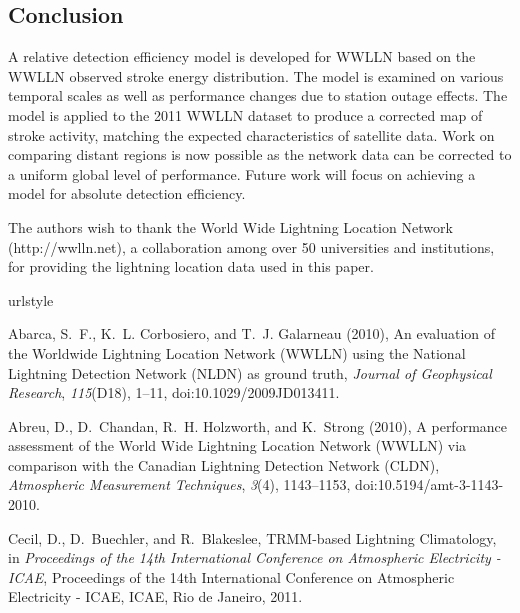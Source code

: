 \documentclass[draft,ras]{agutex}
\begin{document}
\begin{article}
\section{Conclusion}

A relative detection efficiency model is developed for WWLLN based on the WWLLN observed stroke energy distribution. The model is examined on various temporal scales as well as performance changes due to station outage effects. The model is applied to the 2011 WWLLN dataset to produce a corrected map of stroke activity, matching the expected characteristics of satellite data. Work on comparing distant regions is now possible as the network data can be corrected to a uniform global level of performance. Future work will focus on achieving a model for absolute detection efficiency.

\begin{acknowledgments}

The authors wish to thank the World Wide Lightning Location Network (http://wwlln.net), a collaboration among over 50 universities and institutions, for providing the lightning location data used in this paper.

\end{acknowledgments}

  \begin{thebibliography}{23}
\providecommand{\natexlab}[1]{#1}
\expandafter\ifx\csname urlstyle\endcsname\relax
  \providecommand{\doi}[1]{doi:\discretionary{}{}{}#1}\else
  \providecommand{\doi}{doi:\discretionary{}{}{}\begingroup
  \urlstyle{rm}\Url}\fi

Abarca, S.~F., K.~L. Corbosiero, and T.~J. Galarneau (2010), {An evaluation of
  the Worldwide Lightning Location Network (WWLLN) using the National Lightning
  Detection Network (NLDN) as ground truth}, \textit{Journal of Geophysical
  Research}, \textit{115}(D18), 1--11, \doi{10.1029/2009JD013411}.

Abreu, D., D.~Chandan, R.~H. Holzworth, and K.~Strong (2010), {A performance
  assessment of the World Wide Lightning Location Network (WWLLN) via
  comparison with the Canadian Lightning Detection Network (CLDN)},
  \textit{Atmospheric Measurement Techniques}, \textit{3}(4), 1143--1153,
  \doi{10.5194/amt-3-1143-2010}.

Cecil, D., D.~Buechler, and R.~Blakeslee, {TRMM-based Lightning Climatology},
  in \textit{Proceedings of the 14th International Conference on Atmospheric
  Electricity - ICAE}, Proceedings of the 14th International Conference on
  Atmospheric Electricity - ICAE, ICAE, Rio de Janeiro, 2011.


\end{thebibliography}
\end{article}
\end{document}
